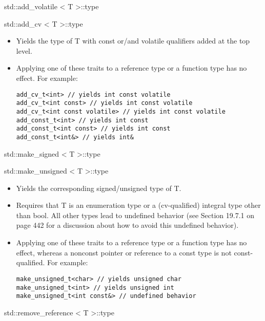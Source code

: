 std::add\_volatile < T >::type

std::add\_cv < T >::type

\begin{itemize}
\item
Yields the type of T with const or/and volatile qualifiers added at the top level.

\item
Applying one of these traits to a reference type or a function type has no effect. For example:
\begin{lstlisting}[style=styleCXX]
add_cv_t<int> // yields int const volatile
add_cv_t<int const> // yields int const volatile
add_cv_t<int const volatile> // yields int const volatile
add_const_t<int> // yields int const
add_const_t<int const> // yields int const
add_const_t<int&> // yields int&
\end{lstlisting}
\end{itemize}

std::make\_signed < T >::type

std::make\_unsigned < T >::type

\begin{itemize}
\item
Yields the corresponding signed/unsigned type of T.

\item
Requires that T is an enumeration type or a (cv-qualified) integral type other than bool. All other types lead to undefined behavior (see Section 19.7.1 on page 442 for a discussion about how to avoid this undefined behavior).

\item
Applying one of these traits to a reference type or a function type has no effect, whereas a nonconst pointer or reference to a const type is not const-qualified. For example:
\begin{lstlisting}[style=styleCXX]
make_unsigned_t<char> // yields unsigned char
make_unsigned_t<int> // yields unsigned int
make_unsigned_t<int const&> // undefined behavior
\end{lstlisting}
\end{itemize}

std::remove\_reference < T >::type

